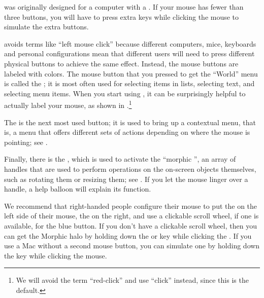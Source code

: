 \documentclass[a4paper,10pt,twoside]{book}
\begin{document}
\sq was originally designed for a computer with a .  If your mouse has fewer than three buttons, you will have to press extra keys while clicking the mouse to simulate the extra buttons.

\sq avoids terms like ``left mouse click'' because different computers, mice, keyboards and personal configurations mean that different users will need to press different physical buttons to achieve the same effect.  Instead, the mouse buttons are labeled with colors.  The mouse button that you pressed to get the ``World'' menu is called the ; it is most often used for selecting items in lists, selecting text, and selecting menu items.
When you start using \sq, it can be surprisingly helpful to actually label your mouse, as shown in .\footnote{We will avoid the term ``red-click'' and use ``click'' instead, since this is the default.}

The  is the next most used button; it is used to bring up a contextual menu, that is, a menu that offers different sets of actions depending on where the mouse is pointing; see .


Finally, there is the , which is used to activate the ``morphic '', an array of handles that are used to perform operations on the on-screen objects themselves, such as rotating them or resizing them; see . 
If you let the mouse linger over a handle, a help balloon will explain its function.



We recommend that right-handed people configure their mouse to put the  on the left side of their mouse, the  on the right, and use a clickable scroll wheel, if one is available, for the blue button.  If you don't have a clickable scroll wheel, then you can get the Morphic halo by holding down the  or  key while clicking the .  If you use a Mac without a second mouse button, you can simulate one by holding down the \clover{} key while clicking the mouse.
\end{document}
